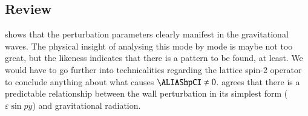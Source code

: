




\subsection{Review}
    
    
     shows that the perturbation parameters clearly manifest in the gravitational waves. The physical insight of analysing this mode by mode is maybe not too great, but the likeness indicates that there is a pattern to be found, at least. We would have to go further into technicalities regarding the lattice spin-2 operator to conclude anything about what causes $\hpCI\neq 0$. 
     agrees that there is a predictable relationship between the wall perturbation in its simplest form ($\varepsilon \sin{py}$) and gravitational radiation. 


